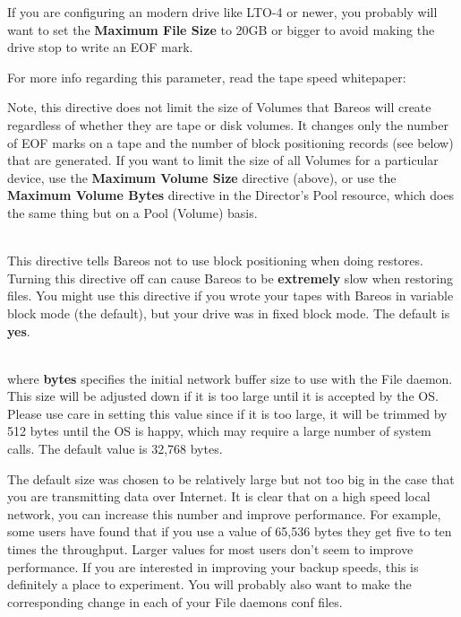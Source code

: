 \begin{description}
If you are configuring an modern drive like LTO-4 or newer, you probably will
want to set the {\bf Maximum File Size} to 20GB or bigger to avoid making
the drive stop to write an EOF mark.

For more info regarding this parameter, read the tape speed whitepaper:

Note, this directive does not limit the size of Volumes that Bareos
will create regardless of whether they are tape or disk volumes. It
changes only the number of EOF marks on a tape and the number of
block positioning records (see below) that are generated. If you
want to limit the size of all Volumes for a particular device, use
the {\bf Maximum Volume Size} directive (above), or use the
{\bf Maximum Volume Bytes} directive in the Director's Pool resource,
which does the same thing but on a Pool (Volume) basis.

\item [Block Positioning = {\textless}yes{\textbar}no{\textgreater}] \hfill \\
This directive tells Bareos not to use block positioning when doing restores.
Turning this directive off can cause Bareos to be {\bf extremely} slow
when restoring files.  You might use this directive if you wrote your
tapes with Bareos in variable block mode (the default), but your drive
was in fixed block mode. The default is {\bf yes}.


\item [Maximum Network Buffer Size = {\textless}bytes{\textgreater}] \hfill \\
where {\bf bytes} specifies the initial network buffer  size to use with the
File daemon.  This size will be adjusted down if it is too large until
it is accepted by the OS. Please use care in setting this value since if
it is too large, it will be trimmed by 512 bytes until the OS is happy,
which may require a large number of system calls.  The default value is
32,768 bytes.

The default size was chosen to be relatively large but not too big in
the case that you are transmitting data over Internet.  It is clear that
on a high speed local network, you can increase this number and improve
performance. For example, some users have found that if you use a value
of 65,536 bytes they get five to ten times the throughput.  Larger values for
most users don't seem to improve performance. If you are interested
in improving your backup speeds, this is definitely a place to
experiment. You will probably also want to make the corresponding change
in each of your File daemons conf files.


\end{description}

